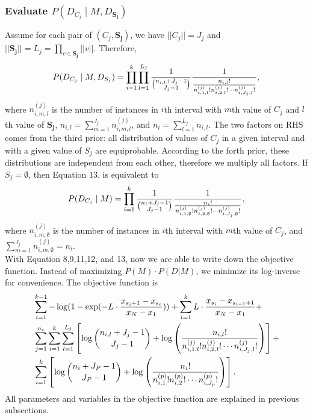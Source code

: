 \subsubsection{Evaluate $P(D_{C_i} \mid M, D_{\boldsymbol{S_i}})$}
Assume for each pair of $(C_j, \boldsymbol{S_j})$, we have $||C_j || = J_j$ and $|| \boldsymbol{S_j} || = L_j = \prod_{v \in \boldsymbol{S_j}} || v ||$. Therefore,
\begin{equation}
P(D_{C_j}  \mid M, D_{S_j}) =
\prod_{i=1}^{k} \prod_{l=1}^{L_j} {{1}\over{{n_{i,l} + J_j - 1}\choose{J_j-1}}}
{{1}\over{ {{n_{i,l}}!}\over{ {n^{(j)}_{i,1,l} !} {n^{(j)}_{i,2,l} !} \cdots {n^{(j)}_{i,J_j,l} !}}  }},
\end{equation}
where $n^{(j)}_{i,m,l}$ is the number of instances in $i$th interval with $m$th value of $C_j$ and $l$th value of $\boldsymbol{S_j}$, $n_{i,l} = \sum_{m=1}^{J_j} n^{(j)}_{i,m,l}$, and $n_i = \sum_{l=1}^{L_j} n_{i,l}$. The two factors on RHS comes from the third prior: all distribution of values of $C_j$ in a given interval and with a given value of $S_j$ are equiprobable. According to the forth prior, these distributions are independent from each other, therefore we multiply all factors. If $S_j = \emptyset$, then Equation 13. is equivalent to
\begin{equation}
P(D_{C_j}  \mid M) =
\prod_{i=1}^{k}  {{1}\over{{n_{i} + J_j - 1}\choose{J_j-1}}}
{{1}\over{ {{n_{i}}!}\over{ {n^{(j)}_{i,1,\emptyset} !} {n^{(j)}_{i,2,\emptyset} !} \cdots {n^{(j)}_{i,J_j,\emptyset} !}}  }},
\end{equation}
where $n^{(j)}_{i,m,\emptyset}$ is the number of instances in $i$th interval with $m$th value of $C_j$, and $\sum_{m=1}^{J_j} n^{(j)}_{i,m,\emptyset} = n_i$. \\

With Equation 8,9,11,12, and 13, now we are able to write down the objective function. Instead of maximizing $P(M) \cdot P(D|M)$, we minimize its log-inverse for convenience. The objective function is
\begin{equation}
\begin{aligned}
& \sum_{i=1}^{k-1} - \log(1 - {\exp(- L \cdot {{x_{s_i+1} - x_{s_i}}\over{x_N - x_1}})}) +  \sum_{i=1}^{k} L \cdot {{x_{s_{i}} - x_{s_{i-1} + 1}}\over{x_N - x_1}} +\\
&  \sum_{j=1}^{n_c} \sum_{i=1}^{k}  \sum_{l=1}^{L_j} \left[  \log{{n_{i,l} + J_j - 1}\choose{J_j-1}} + \log \left( { {{n_{i,l}}!}\over{ {n^{(j)}_{i,1,l} !} {n^{(j)}_{i,2,l} !} \cdots {n^{(j)}_{i,J_j,l} !}} } \right) \right] + \\
& \sum_{i=1}^k \left[  \log {{n_{i} + J_P - 1}\choose{J_P-1}} + \log \left( { {{n_i}!}\over{ {n^{(p)}_{i,1} !} {n^{(p)}_{i,2} !} \cdots {n^{(p)}_{i,J_p} !}} } \right) \right].
\end{aligned}
\end{equation}
All parameters and variables in the objective function are explained in previous subsections.
